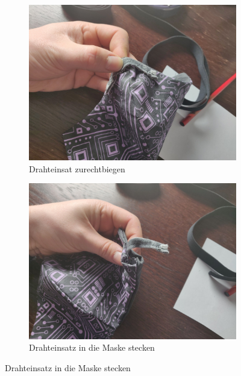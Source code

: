 \documentclass[12pt,parskip=full]{scrartcl}
\begin{document}
\begin{figure}[hp]
    \vspace{0.5cm}
    \centering
    \begin{subfigure}{0.48\textwidth}
        \centering
        \includegraphics[width = \linewidth]{Pictures/09_NoseParts/NoseParts03_resized.jpg}
        \caption{Drahteinsat zurechtbiegen}
        \label{Nose03}
    \end{subfigure}
    \begin{subfigure}{0.48\textwidth}
        \centering
        \includegraphics[width = \linewidth]{Pictures/09_NoseParts/NoseParts04_resized.jpg}
        \caption{Drahteinsatz in die Maske stecken}
        \label{Nose04}
    \end{subfigure}

\end{figure}
\end{document}
